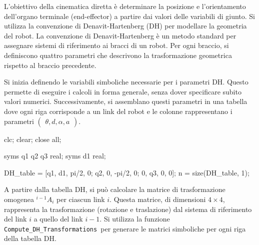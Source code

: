 \documentclass[11pt, a4paper]{article}
\begin{document}

\begin{par}
\begin{flushleft}
L'obiettivo della cinematica diretta è determinare la posizione e l'orientamento dell'organo terminale (end-effector) a partire dai valori delle variabili di giunto. Si utilizza la convenzione di Denavit-Hartenberg (DH) per modellare la geometria del robot. La convenzione di Denavit-Hartenberg è un metodo standard per assegnare sistemi di riferimento ai bracci di un robot. Per ogni braccio, si definiscono quattro parametri che descrivono la trasformazione geometrica rispetto al braccio precedente.
\end{flushleft}
\end{par}

\begin{par}
\begin{flushleft}
Si inizia definendo le variabili simboliche necessarie per i parametri DH. Questo permette di eseguire i calcoli in forma generale, senza dover specificare subito valori numerici. Successivamente, si assemblano questi parametri in una tabella dove ogni riga corrisponde a un link del robot e le colonne rappresentano i parametri $\left(\begin{array}{c}
\theta ,d,\alpha ,a
\end{array}\right)$.
\end{flushleft}
\end{par}

\begin{matlabcode}
clc; clear; close all;

syms q1 q2 q3 real;
syms d1 real;

DH_table = [q1, d1, pi/2,  0;
            q2, 0,  -pi/2, 0;
            0,  q3, 0,     0];
n = size(DH_table, 1);
\end{matlabcode}

\begin{par}
\begin{flushleft}
A partire dalla tabella DH, si può calcolare la matrice di trasformazione omogenea $^{i-1}A_i$ per ciascun link $i$. Questa matrice, di dimensioni $4\times 4$, rappresenta la trasformazione (rotazione e traslazione) dal sistema di riferimento del link $i$ a quello del link $i-1$. Si utilizza la funzione \texttt{Compute\_DH\_Transformations }per generare le matrici simboliche per ogni riga della tabella DH.
\end{flushleft}
\end{par}
\end{document}
